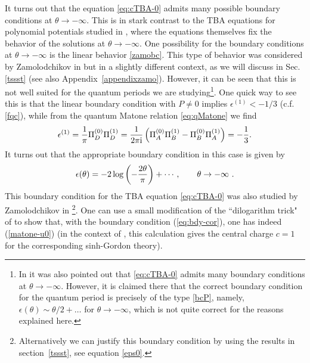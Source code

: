 \documentclass[a4paper,11pt]{article}
\theoremstyle{definition}
\newcommand{\ri}{{\rm i}}
\def\({\left(}
\def\){\right)}
\begin{document}
It turns out that the equation \eqref{eq:cTBA-0} admits many possible
boundary conditions at $\theta \rightarrow -\infty$. This is in stark
contrast to the TBA equations for polynomial potentials studied in
\cite{oper, ims}, where the equations themselves fix the behavior of
the solutions at $\theta \rightarrow -\infty$. One possibility for the
boundary conditions at $\theta \rightarrow -\infty$ is the linear
behavior \eqref{zamobc}. This type of behavior was considered by
Zamolodchikov in \cite{post-zamo} but in a slightly different context,
as we will discuss in Sec. \ref{tssst} (see also
Appendix~\ref{appendixzamo}).  However, it can be seen that this is
not well suited for the quantum periods we are studying\footnote{In
  \cite{oper} it was also pointed out that \eqref{eq:cTBA-0} admits
  many boundary conditions at $\theta \rightarrow -\infty$.  However,
  it is claimed there that the correct boundary condition for the
  quantum period is precisely of the type \eqref{bcP}, namely,
  $\epsilon(\theta)\sim \theta/2+\ldots$ for $\theta\to-\infty$, which
  is not quite correct for the reasons explained here.}. One quick way
to see this is that the linear boundary condition with $P \not=0$
implies $\epsilon^{(1)}<-1/3$ (c.f. \eqref{fqc}), while from the
quantum Matone relation \eqref{eq:qMatone} we find
%
\begin{equation}
\label{matone-u0}
  \epsilon^{(1)} = \frac{1}{\pi}\Pi_D^{(0)}\Pi_D^{(1)} =
  \frac{1}{2\pi\ri}\(\Pi_A^{(0)}\Pi_B^{(1)} - \Pi_B^{(0)}\Pi_A^{(1)}\)
  = -\frac{1}{3}.
\end{equation}
%
It turns out that the appropriate boundary condition in this case is
given by
%
\begin{equation}\label{eq:bdy-cor}
  \epsilon(\theta)=-2 \log\left( -{2 \theta \over \pi} \right)
  +\cdots, \qquad \theta \to -\infty \ .
\end{equation}
%
This boundary condition for the TBA equation \eqref{eq:cTBA-0} was
also studied by Zamolodchikov in
\cite{zamo-reso}\footnote{Alternatively we can justify this boundary
  condition by using the results in section~\ref{tssst}, see equation
  \eqref{eps0}.}.  One can use a small modification of the
``dilogarithm trick" of \cite{zamo-TBA} to show that, with the
boundary condition (\ref{eq:bdy-cor}), one has indeed
(\ref{matone-u0}) (in the context of \cite{zamo-reso}, this
calculation gives the central charge $c=1$ for the corresponding
sinh-Gordon theory).
\end{document}
